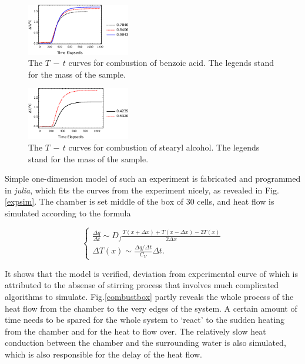 \documentclass[%
 reprint,
 amsmath,amssymb,
 aps,
10.5pt,
]{revtex4-1}
\begin{document}
\begin{figure}
\centering
\includegraphics[width=0.4\textwidth]{figures/BATemp.eps}
\caption{The $T\,-\,t$ curves for combustion of benzoic acid. The legends stand for the mass of the sample.}
\label{BA}
\end{figure}

\begin{figure}
\centering
\includegraphics[width=0.4\textwidth]{figures/18olTemp.eps}
\caption{The $T\,-\,t$ curves for combustion of stearyl alcohol. The legends stand for the mass of the sample.}
\label{R}
\end{figure}

Simple one-dimension model of such an experiment is fabricated and programmed in \emph{julia}, which fits the curves from the experiment nicely, as revealed in Fig.\ref{expsim}. The chamber is set middle of the box of 30 cells, and heat flow is simulated according to the formula

\begin{equation}
\begin{cases}
\frac{\Delta q}{\Delta t} \sim D_f \frac{T(x+\Delta x)+T(x-\Delta x)-2T(x)}{2\Delta x}\\
\Delta  T(x) \sim \frac{\Delta q /\Delta t}{C_V}\Delta t.
\end{cases}
\end{equation}

It shows that the model is verified, deviation from experimental curve of which is attributed to the absense of stirring process that involves much complicated algorithms to simulate. Fig.\ref{combustbox}
 partly reveals the whole process of the heat flow from the chamber to the very edges of the system. A certain amount of time needs to be spared for the whole system to `react' to the sudden heating from the chamber and for the heat to flow over. The relatively slow heat conduction between the chamber and the surrounding water is also simulated, which is also responsible for the delay of the heat flow. 
\end{document}
